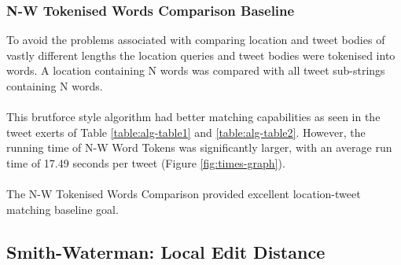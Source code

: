 \documentclass[11pt,a4paper]{article}
\begin{document}


\subsubsection{N-W Tokenised Words Comparison Baseline}

To avoid the problems associated with comparing location and tweet bodies of vastly different lengths the location queries and tweet bodies were tokenised into words. A location containing N words was compared with all tweet sub-strings containing N words.\\\\
This brutforce style algorithm had better matching capabilities as seen in the tweet exerts of Table \ref{table:alg-table1} and \ref{table:alg-table2}. However, the running time of N-W Word Tokens was significantly larger, with an average run time of 17.49 seconds per tweet (Figure \ref{fig:times-graph}).\\\\
The N-W Tokenised Words Comparison provided excellent location-tweet matching baseline goal.


\subsection{Smith-Waterman: Local Edit Distance}
\end{document}
